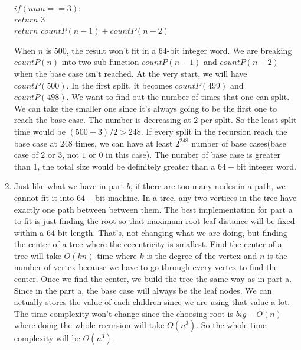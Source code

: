\documentclass[11pt]{article}
\begin{document}
\begin{solution}
\begin{enumerate}
\begin{algorithm}
        \\  $if(num == 3):$\+
        \\      $return$ $3$\-
        \\  $return$ $countP(n-1) + countP(n-2)$
        \end{algorithm}
        $$  $$
        When $n$ is $500$, the result won't fit in a $64$-bit integer word. We are breaking $countP(n)$ into two sub-function $countP(n-1)$ and $countP(n-2)$ when the base case isn't reached. At the very start, we will have $countP(500)$. In the first split, it becomes $countP(499)$ and $countP(498)$. We want to find out the number of times that one can split. We can take the smaller one since it's always going to be the first one to reach the base case. The number is decreasing at $2$ per split. So the least split time would be $(500-3)/2 > 248$. If every split in the recursion reach the base case at $248$ times, we can have at least $2^248$ number of base cases(base case of $2$ or $3$, not $1$ or $0$ in this case). The number of base case is greater than 1, the total size would be definitely greater than a $64-$bit integer word. 
    \item
        Just like what we have in part $b$, if there are too many nodes in a path, we cannot fit it into $64-$bit machine. In a tree, any two vertices in the tree have exactly one path between between them. The best implementation for part a to fit is just finding the root so that maximum root-leaf distance will be fixed within a $64$-bit length. That's, not changing what we are doing, but finding the center of a tree where the eccentricity is smallest. Find the center of a tree will take $O(kn)$ time where $k$ is the degree of the vertex and $n$ is the number of vertex because we have to go through every vertex to find the center. Once we find the center, we build the tree the same way as in part a. Since in the part a, the base case will always be the leaf nodes. We can actually stores the value of each children since we are using that value a lot. The time complexity won't change since the choosing root is $big-O(n)$ where doing the whole recursion will take $O(n^3)$. So the whole time complexity will be $O(n^3)$.
\end{enumerate}
\end{solution}
\end{document}
